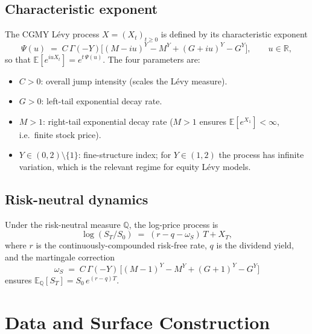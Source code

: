 \documentclass[11pt,a4paper]{article}
\newcommand{\E}{\mathbb{E}}
\newcommand{\R}{\mathbb{R}}
\begin{document}
\subsection{Characteristic exponent}

The CGMY L\'{e}vy process $X = (X_t)_{t \ge 0}$ is defined by its
characteristic exponent
\begin{equation}
  \Psi(u) \;=\; C\,\Gamma(-Y)\bigl[
    (M - iu)^{Y} - M^{Y}
    + (G + iu)^{Y} - G^{Y}
  \bigr],
  \qquad u \in \R,
  \label{eq:cgmy_cf}
\end{equation}
so that $\E[e^{iuX_t}] = e^{t\,\Psi(u)}$.  The four parameters are:
\begin{itemize}[noitemsep]
  \item $C > 0$: overall jump intensity (scales the L\'{e}vy measure).
  \item $G > 0$: left-tail exponential decay rate.
  \item $M > 1$: right-tail exponential decay rate
        ($M > 1$ ensures $\E[e^{X_1}] < \infty$, i.e.\ finite stock price).
  \item $Y \in (0,2)\setminus\{1\}$: fine-structure index; for $Y \in (1,2)$
        the process has infinite variation, which is the relevant regime
        for equity L\'{e}vy models.
\end{itemize}

\subsection{Risk-neutral dynamics}

Under the risk-neutral measure $\mathbb{Q}$, the log-price process is
\begin{equation}
  \log(S_T / S_0) \;=\; (r - q - \omega_S)\,T + X_T,
  \label{eq:log_price}
\end{equation}
where $r$ is the continuously-compounded risk-free rate, $q$ is the dividend
yield, and the martingale correction
\begin{equation}
  \omega_S \;=\; C\,\Gamma(-Y)\,
  \bigl[(M-1)^Y - M^Y + (G+1)^Y - G^Y\bigr]
  \label{eq:omega}
\end{equation}
ensures $\E_\mathbb{Q}[S_T] = S_0\,e^{(r-q)T}$.

\section{Data and Surface Construction}
\label{sec:data}
\end{document}
